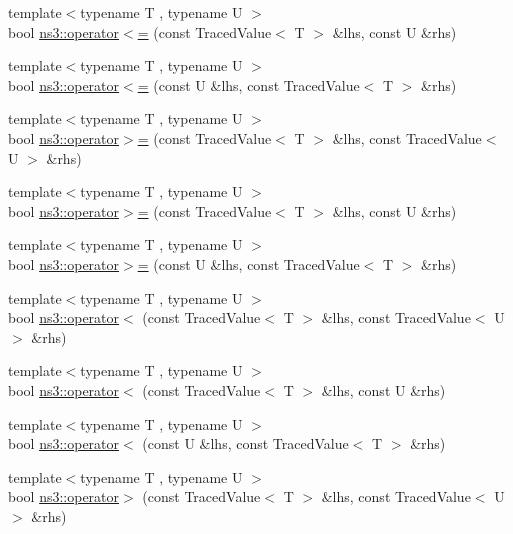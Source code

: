 \begin{DoxyCompactItemize}
{\footnotesize template$<$typename T , typename U $>$ }\\bool \hyperlink{group__tracing_ga1d48b5c482c58e392a481775efdab9d8}{ns3\+::operator$<$=} (const Traced\+Value$<$ T $>$ \&lhs, const U \&rhs)
\item 
{\footnotesize template$<$typename T , typename U $>$ }\\bool \hyperlink{group__tracing_ga3391447d64b67baaedb34cd87e538487}{ns3\+::operator$<$=} (const U \&lhs, const Traced\+Value$<$ T $>$ \&rhs)
\item 
{\footnotesize template$<$typename T , typename U $>$ }\\bool \hyperlink{group__tracing_ga049c8b34ae1b4a36aca00d229364d165}{ns3\+::operator$>$=} (const Traced\+Value$<$ T $>$ \&lhs, const Traced\+Value$<$ U $>$ \&rhs)
\item 
{\footnotesize template$<$typename T , typename U $>$ }\\bool \hyperlink{group__tracing_gaba33e320b013d25577afbc8a814d5aab}{ns3\+::operator$>$=} (const Traced\+Value$<$ T $>$ \&lhs, const U \&rhs)
\item 
{\footnotesize template$<$typename T , typename U $>$ }\\bool \hyperlink{group__tracing_gafdd3babca6d4693bb77d4f348b59d79f}{ns3\+::operator$>$=} (const U \&lhs, const Traced\+Value$<$ T $>$ \&rhs)
\item 
{\footnotesize template$<$typename T , typename U $>$ }\\bool \hyperlink{group__tracing_ga6a4efa69eef34b239e0167de71730cc4}{ns3\+::operator$<$} (const Traced\+Value$<$ T $>$ \&lhs, const Traced\+Value$<$ U $>$ \&rhs)
\item 
{\footnotesize template$<$typename T , typename U $>$ }\\bool \hyperlink{group__tracing_ga93fb34d76c9306aad2a00ce0aef96441}{ns3\+::operator$<$} (const Traced\+Value$<$ T $>$ \&lhs, const U \&rhs)
\item 
{\footnotesize template$<$typename T , typename U $>$ }\\bool \hyperlink{group__tracing_ga0da7f38ad03dddffff29282d4caf13b2}{ns3\+::operator$<$} (const U \&lhs, const Traced\+Value$<$ T $>$ \&rhs)
\item 
{\footnotesize template$<$typename T , typename U $>$ }\\bool \hyperlink{group__tracing_ga7ef2f576a49a90e3302243ae951434b4}{ns3\+::operator$>$} (const Traced\+Value$<$ T $>$ \&lhs, const Traced\+Value$<$ U $>$ \&rhs)
\item 

\end{DoxyCompactItemize}
